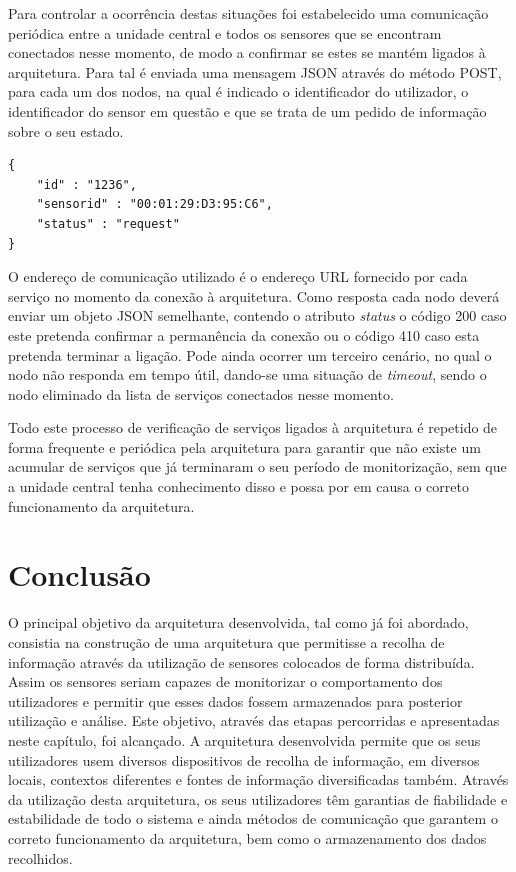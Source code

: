 Para controlar a ocorrência destas situações foi estabelecido uma comunicação periódica entre a unidade central e todos os sensores que se encontram conectados nesse momento, de modo a confirmar se estes se mantém ligados à arquitetura. Para tal é enviada uma mensagem JSON através do método POST, para cada um dos nodos, na qual é indicado o identificador do utilizador, o identificador do sensor em questão e que se trata de um pedido de informação sobre o seu estado.\\

\begin{lstlisting}[caption=Mensagem de verificação de estado de um nodo]
{
	"id" : "1236",
  	"sensorid" : "00:01:29:D3:95:C6",
	"status" : "request"
}

\end{lstlisting}

O endereço de comunicação utilizado é o endereço URL fornecido por cada serviço no momento da conexão à arquitetura. Como resposta cada nodo deverá enviar um objeto JSON semelhante, contendo o atributo \textit{status} o código 200 caso este pretenda confirmar a permanência da conexão ou o código 410 caso esta pretenda terminar a ligação. Pode ainda ocorrer um terceiro cenário, no qual o nodo não responda em tempo útil, dando-se uma situação de \textit{timeout}, sendo o nodo eliminado da lista de serviços conectados nesse momento.

Todo este processo de verificação de serviços ligados à arquitetura é repetido de forma frequente e periódica pela arquitetura para garantir que não existe um acumular de serviços que já terminaram o seu período de monitorização, sem que a unidade central tenha conhecimento disso e possa por em causa o correto funcionamento da arquitetura.

\section{Conclusão}

O principal objetivo da arquitetura desenvolvida, tal como já foi abordado, consistia na construção de uma arquitetura que permitisse a recolha de informação através da utilização de sensores colocados de forma distribuída. Assim os sensores seriam capazes de monitorizar o comportamento dos utilizadores e permitir que esses dados fossem armazenados para posterior utilização e análise. Este objetivo, através das etapas percorridas e apresentadas neste capítulo, foi alcançado. A arquitetura desenvolvida permite que os seus utilizadores usem diversos dispositivos de recolha de informação, em diversos locais, contextos diferentes e fontes de informação diversificadas também. Através da utilização desta arquitetura, os seus utilizadores têm garantias de fiabilidade e estabilidade de todo o sistema e ainda métodos de comunicação que garantem o correto funcionamento da arquitetura, bem como o armazenamento dos dados recolhidos.

